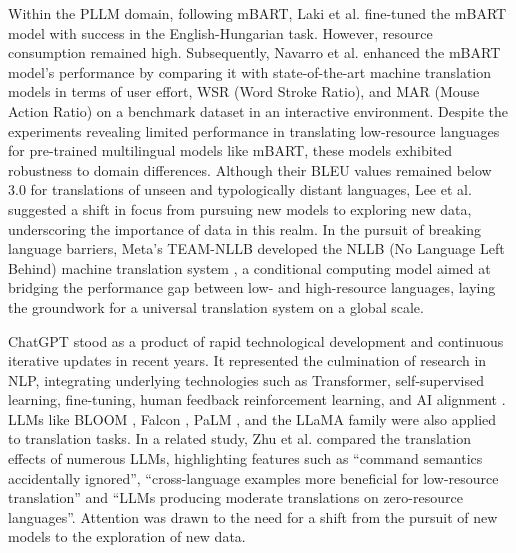 \documentclass[acmsmall]{acmart}
\begin{document}
Within the PLLM domain, following mBART, Laki et al. \cite{Laki} fine-tuned the mBART model with success in the English-Hungarian task. However, resource consumption remained high. Subsequently, Navarro et al. \cite{Navarro} enhanced the mBART model's performance by comparing it with state-of-the-art machine translation models in terms of user effort, WSR (Word Stroke Ratio), and MAR (Mouse Action Ratio) on a benchmark dataset in an interactive environment. Despite the experiments revealing limited performance in translating low-resource languages for pre-trained multilingual models like mBART, these models exhibited robustness to domain differences. Although their BLEU values remained below 3.0 for translations of unseen and typologically distant languages, Lee et al. \cite{Shiun} suggested a shift in focus from pursuing new models to exploring new data, underscoring the importance of data in this realm. In the pursuit of breaking language barriers, Meta's TEAM-NLLB developed the NLLB (No Language Left Behind) machine translation system \cite{Marta}, a conditional computing model aimed at bridging the performance gap between low- and high-resource languages, laying the groundwork for a universal translation system on a global scale.

ChatGPT \cite{OpenAI01} stood as a product of rapid technological development and continuous iterative updates in recent years. It represented the culmination of research in NLP, integrating underlying technologies such as Transformer, self-supervised learning, fine-tuning, human feedback reinforcement learning, and AI alignment \cite{Zhangqi}. LLMs like BLOOM \cite{Teven}, Falcon \cite{Ebtesam}, PaLM \cite{Aakanksh}, and the LLaMA family \cite{Hugo1} \cite{Hugo2} were also applied to translation tasks. In a related study, Zhu et al. \cite{Wenhao} compared the translation effects of numerous LLMs, highlighting features such as ``command semantics accidentally ignored'', ``cross-language examples more beneficial for low-resource translation'' and ``LLMs producing moderate translations on zero-resource languages''. Attention was drawn to the need for a shift from the pursuit of new models to the exploration of new data.
\end{document}
